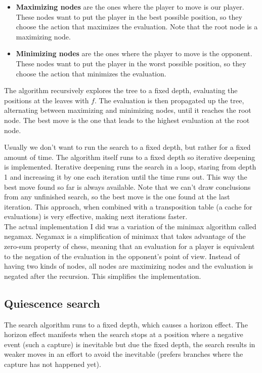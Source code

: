 \begin{itemize}
\item \textbf{Maximizing nodes} are the ones where the player to move is our player. These nodes want to put the player in the best possible position, so they choose the action that maximizes the evaluation. Note that the root node is a maximizing node.
\item \textbf{Minimizing nodes} are the ones where the player to move is the opponent. These nodes want to put the player in the worst possible position, so they choose the action that minimizes the evaluation.
\end{itemize}

The algorithm recursively explores the tree to a fixed depth, evaluating the positions at the leaves with $f$. The evaluation is then propagated up the tree, alternating between maximizing and minimizing nodes, until it reaches the root node. The best move is the one that leads to the highest evaluation at the root node.

Usually we don't want to run the search to a fixed depth, but rather for a fixed amount of time. The algorithm itself runs to a fixed depth so iterative deepening is implemented. Iterative deepening runs the search in a loop, staring from depth 1 and increasing it by one each iteration until the time runs out. This way the best move found so far is always available. Note that we can't draw conclusions from any unfinished search, so the best move is the one found at the last iteration. This approach, when combined with a transposition table (a cache for evaluations) is very effective, making next iterations faster. \\

The actual implementation I did was a variation of the minimax algorithm called negamax. Negamax is a simplification of minimax that takes advantage of the zero-sum property of chess, meaning that an evaluation for a player is equivalent to the negation of the evaluation in the opponent's point of view. Instead of having two kinds of nodes, all nodes are maximizing nodes and the evaluation is negated after the recursion. This simplifies the implementation.

\subsection{Quiescence search}

The search algorithm runs to a fixed depth, which causes a horizon effect. The horizon effect manifests when the search stops at a position where a negative event (such a capture) is inevitable but due the fixed depth, the search results in weaker moves in an effort to avoid the inevitable (prefers branches where the capture has not happened yet).

